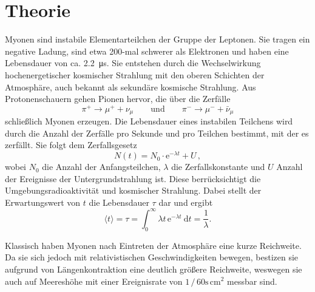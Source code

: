 \section{Theorie}
\label{sec:Theorie}

Myonen sind instabile Elementarteilchen der Gruppe der Leptonen. 
Sie tragen ein negative Ladung, sind etwa 200-mal schwerer als Elektronen 
und haben eine Lebensdauer von ca. \qty{2,2}{\micro\second}.
Sie entstehen durch die Wechselwirkung hochenergetischer kosmischer Strahlung
mit den oberen Schichten der Atmosphäre,
auch bekannt als sekundäre kosmische Strahlung.
Aus Protonenschauern gehen Pionen hervor,
die über die Zerfälle
\begin{equation*}
    \pi^{+} \rightarrow \mu^{+}+\nu_\mu \qquad \text {und} \qquad \pi^{-} \rightarrow \mu^{-}+\bar{\nu}_\mu
\end{equation*}
schließlich Myonen erzeugen.
Die Lebensdauer eines instabilen Teilchens wird durch die Anzahl der Zerfälle pro Sekunde 
und pro Teilchen bestimmt, mit der es zerfällt. 
Sie folgt dem Zerfallsgesetz
\begin{equation} \label{eq:zerfallsgesetz}
    N(t) = N_0 \cdot \mathrm{e}^{-\lambda t} + U \, ,
\end{equation}
wobei $N_0$ die Anzahl der Anfangsteilchen, $\lambda$ die Zerfallskonstante
und $U$ Anzahl der Ereignisse der Untergrundstrahlung ist.
Diese berrücksichtigt die Umgebungsradioaktivität und kosmischer Strahlung.
Dabei stellt der Erwartungswert von $t$ die Lebensdauer $\tau$ dar und ergibt
\begin{equation} \label{eq:tau}
    \langle t\rangle=\tau=\int_0^{\infty} \lambda t \, \mathrm{e}^{-\lambda t} \mathrm{~d} t=\frac{1}{\lambda} .
\end{equation}

Klassisch haben Myonen nach Eintreten der Atmosphäre eine kurze Reichweite.
Da sie sich jedoch mit relativistischen Geschwindigkeiten bewegen,
bestizen sie aufgrund von Längenkontraktion eine deutlich größere Reichweite,
weswegen sie auch auf Meereshöhe mit einer Ereignisrate von $1 \, / \, 60\text{s} \, \text{cm}^2$ \cite[208]{grupen} messbar sind.


